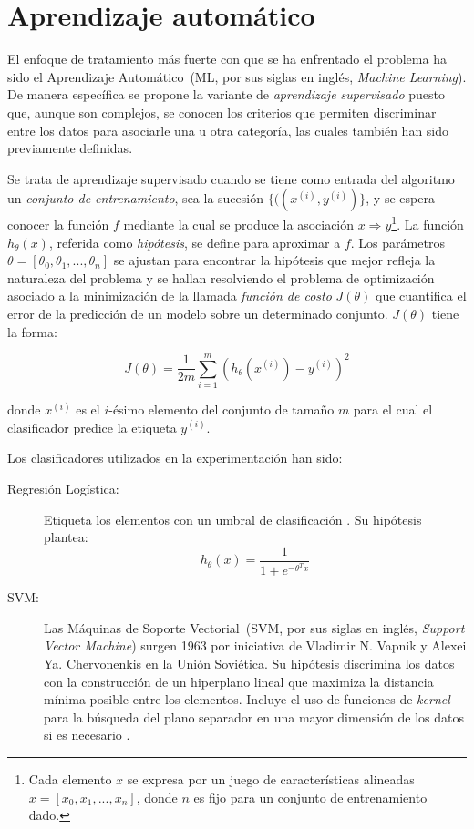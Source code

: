 \section{Aprendizaje autom\'atico}
El enfoque de tratamiento m\'as fuerte con que se ha enfrentado el problema ha sido el Aprendizaje Autom\'atico~(ML, por sus siglas en ingl\'es, \emph{Machine Learning}). De manera espec\'ifica se propone la variante de \emph{aprendizaje supervisado} puesto que, aunque son complejos, se conocen los criterios que permiten discriminar entre los datos para asociarle una u otra categor\'ia, las cuales tambi\'en han sido previamente definidas.


Se trata de aprendizaje supervisado \cite[p.695]{russell2002artificial} cuando se tiene como entrada del algoritmo un \emph{conjunto de entrenamiento}, sea la sucesi\'on $\{ ((x^{(i)}, y^{(i)})\}$, y se espera conocer la funci\'on $f$ mediante la cual se produce la asociaci\'on $x\Rightarrow y$\footnote{Cada elemento $x$ se expresa por un juego de caracter\'isticas alineadas $x = [x_0,x_1,...,x_n]$, donde $n$ es fijo para un conjunto de entrenamiento dado.}. La funci\'on $h_\theta(x)$, referida como \emph{hip\'otesis}, se define para aproximar a $f$. Los par\'ametros $\theta = [\theta_0, \theta_1, ..., \theta_n]$ se ajustan para encontrar la hip\'otesis que mejor refleja la naturaleza del problema y se hallan resolviendo el problema de optimizaci\'on asociado a la minimizaci\'on de la llamada \emph{funci\'on de costo} $J(\theta)$ que cuantifica el error de la predicci\'on de un modelo sobre un determinado conjunto. $J(\theta)$ tiene la forma:

$$ J(\theta) = \dfrac{1}{2m} \sum\limits_{i=1}^{m} (h_{\theta}(x^{(i)}) - y^{(i)})^2 $$

 donde $x^{(i)}$ es el $i$-\'esimo elemento del conjunto de tama\~no $m$ para el cual el clasificador predice la etiqueta $y^{(i)}$.


Los clasificadores utilizados en la experimentaci\'on han sido: 
 \begin{description}
 \item[Regresi\'on Log\'istica:] Etiqueta los elementos con un umbral de clasificaci\'on \cite{murphy2012machine}. Su hip\'otesis plantea:
 \begin{equation}\label{E:logistic_regression_hipotesis}
 h_\theta(x) = \dfrac{1}{1 + e^{-\theta^Tx}}
 \end{equation}
 \item[SVM:] Las M\'aquinas de Soporte Vectorial~(SVM, por sus siglas en ingl\'es, \emph{Support Vector Machine}) surgen 1963  por iniciativa de Vladimir N. Vapnik y Alexei Ya. Chervonenkis en la Uni\'on Sovi\'etica. 
 Su hip\'otesis discrimina los datos con la construcci\'on de un hiperplano lineal que maximiza la distancia m\'inima posible entre los elementos. Incluye el uso de funciones de \emph{kernel} para la b\'usqueda del plano separador en una mayor dimensi\'on de los datos si es necesario \cite[p.15]{francois2017deep} \cite{duda2012pattern}.
 \end{description}




